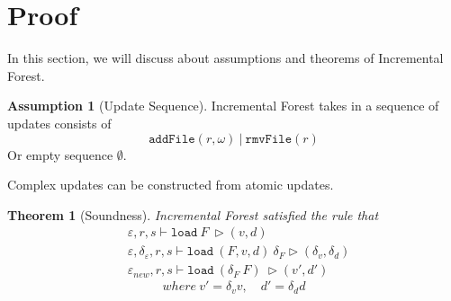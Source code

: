 \documentclass[10pt,twoside,a4paper]{article}
\theoremstyle{theorem}
\newtheorem{theorem}{Theorem}[section]
\theoremstyle{lemma}
\theoremstyle{property}
\theoremstyle{definition}
\theoremstyle{assumption}
\newtheorem{assumption}{Assumption}[section]
\def\snd{\pi_2}
\begin{document}
\begin{comment}
\begin{displaymath}
	\frac{\begin{array}{c}
	\forall n \in \llbracket e \rrbracket^{\varepsilon_{new}}_{\{Path\}} \cap \llbracket e \rrbracket^{\varepsilon_{old}}_{\{Path\}}, ~ v = vs(n), ~d = ds(n)\\
	(\delta_\varepsilon, r \mapsto (r/n, \emptyset)), s \vdash \mathtt{load}_\Delta (F,v,d)~ u \rhd (\delta_v,\delta_d)
	\end{array}}
	{\mathtt{changeVOf}(n) = \mathtt{mod}((n,v), \snd\delta_v), ~~\mathtt{changeDOf}(n) = \mathtt{mod}((n,d), \snd\delta_d)}
\end{displaymath}
If the filename $n$ is preserved in both environments, Incremental Forest delta-load the file recursively. One thing to notice here is that we append the name $n$ directly to the filepath $r$. Because in either old or new environment, the expression $e$ can always be evaluated to this $r/n$ filepath, in this level of recursion, we don't need to record the change in filepath. This makes the delta environment clear of unexpected change on variables.
\end{comment}

\newpage
\section{Proof}
In this section, we will discuss about assumptions and theorems of Incremental Forest.
\begin{assumption}[Update Sequence]
	Incremental Forest takes in a sequence of updates consists of 
	\begin{displaymath}
		\mathtt{addFile}(r,\omega) ~|~ \mathtt{rmvFile}(r)%
	\end{displaymath}
	Or empty sequence $\emptyset$.
\end{assumption}

Complex updates can be constructed from atomic updates.

\begin{comment}
\begin{assumption}[Filesystem is a tree]
	Incremental Forest views symbolic link as a normal file. \\
	not necessarily needed.
\end{assumption}
\end{comment}

\begin{theorem}[Soundness]
	Incremental Forest satisfied the rule that
	\begin{align*}
		& \varepsilon, r, s \vdash \mathtt{load}~ F~ \rhd (v,d)\\
		& \varepsilon, \delta_\varepsilon, r, s \vdash \mathtt{load}~ (F,v,d)~ \delta_F \rhd (\delta_v,\delta_d)\\
		& \varepsilon_{new}, r, s \vdash \mathtt{load}~ (\delta_F~F)~ \rhd (v',d')
	\end{align*}
	\begin{displaymath}
		where ~v' = \delta_v v, \quad d' = \delta_d d
	\end{displaymath}
\end{theorem}
\end{document}
